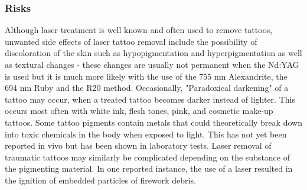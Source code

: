 \documentclass[12pt]{article}
\begin{document}
\subsubsection{Risks}
Although laser treatment is well known and often used to remove tattoos, unwanted side effects of laser tattoo removal include the possibility of discoloration of the skin such as hypopigmentation and hyperpigmentation as well as textural changes - these changes are usually not permanent when the Nd:YAG is used but it is much more likely with the use of the 755 nm Alexandrite, the 694 nm Ruby and the R20 method.
Occasionally, "Paradoxical darkening" of a tattoo may occur, when a treated tattoo becomes darker instead of lighter.
This occurs most often with white ink, flesh tones, pink, and cosmetic make-up tattoos.
Some tattoo pigments contain metals that could theoretically break down into toxic chemicals in the body when exposed to light.
This has not yet been reported in vivo but has been shown in laboratory tests.
Laser removal of traumatic tattoos may similarly be complicated depending on the substance of the pigmenting material.
In one reported instance, the use of a laser resulted in the ignition of embedded particles of firework debris.
\end{document}
